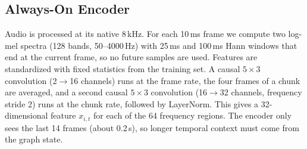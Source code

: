 \subsection{Always-On Encoder}
Audio is processed at its native 8\,kHz. For each 10\,ms frame we compute two log-mel spectra (128 bands, 50--4000\,Hz) with 25\,ms and 100\,ms Hann windows that end at the current frame, so no future samples are used. Features are standardized with fixed statistics from the training set. A causal $5{\times}3$ convolution (2$\to$16 channels) runs at the frame rate, the four frames of a chunk are averaged, and a second causal $5{\times}3$ convolution (16$\to$32 channels, frequency stride 2) runs at the chunk rate, followed by LayerNorm. This gives a 32-dimensional feature $x_{i,t}$ for each of the 64 frequency regions. The encoder only sees the last 14 frames (about 0.2\,s), so longer temporal context must come from the graph state.

